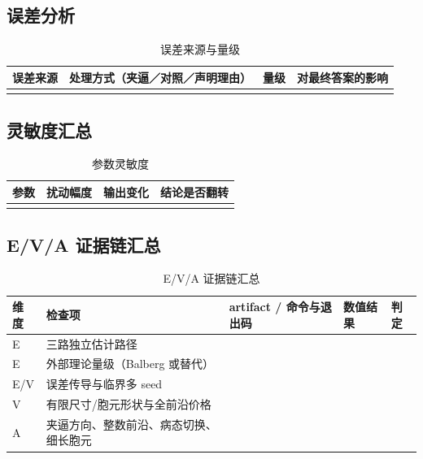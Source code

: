 
\subsection{误差分析}
\begin{table}[htbp]
  \centering
  \caption{误差来源与量级}
  \begin{tabularx}{\linewidth}{lXll}
    \toprule
    误差来源 & 处理方式（夹逼／对照／声明理由） & 量级 & 对最终答案的影响 \\
    \midrule
     &  &  &  \\
    \bottomrule
  \end{tabularx}
\end{table}

\subsection{灵敏度汇总}
\begin{table}[htbp]
  \centering
  \caption{参数灵敏度}
  \begin{tabularx}{\linewidth}{llXl}
    \toprule
    参数 & 扰动幅度 & 输出变化 & 结论是否翻转 \\
    \midrule
     &  &  &  \\
    \bottomrule
  \end{tabularx}
\end{table}

\subsection{E/V/A 证据链汇总}
\begin{table}[htbp]
  \centering
  \caption{E/V/A 证据链汇总}
  \begin{tabularx}{\linewidth}{lXlXl}
    \toprule
    维度 & 检查项 & artifact / 命令与退出码 & 数值结果 & 判定 \\
    \midrule
    E & 三路独立估计路径 &  &  &  \\
    E & 外部理论量级（Balberg 或替代） &  &  &  \\
    E/V & 误差传导与临界多 seed &  &  &  \\
    V & 有限尺寸/胞元形状与全前沿价格 &  &  &  \\
    A & 夹逼方向、整数前沿、病态切换、细长胞元 &  &  &  \\
    \bottomrule
  \end{tabularx}
\end{table}

